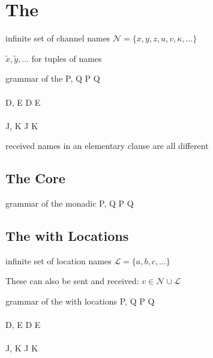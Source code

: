 \section{The \JoinCalc}

infinite set of channel names
$ \mathcal{N} = \{ x, y, z, u, v, \kappa, \ldots \} $

$ \tilde{x}, \tilde{y}, \ldots $ for tuples of names

\begin{JDef}{grammar of the \joincalc}
  P, Q
  \grmr {}
  \altn {}
  \altn P \jpar Q
  \altn \jnullproc
  \\ \\
  D, E
  \grmr {}
  \altn D \jcon E
  \altn \jnulldef
  \\ \\
  J, K
  \grmr {}
  \altn J \jpat K
\end{JDef}

received names in an elementary clause are all different


\subsection{The Core \JoinCalc}

\begin{JDef}{grammar of the monadic \joincalc}
  P, Q
  \grmr {}
  \altn P \jpar Q
  \altn {}
\end{JDef}


\subsection{The \JoinCalc with Locations}

infinite set of location names
$ \mathcal{L} = \{ a, b, c, \ldots \} $

These can also be sent and received:
$ v \in \mathcal{N} \cup \mathcal{L} $


\begin{JDef}{grammar of the \joincalc with locations}
  P, Q
  \grmr {}
  \altn {}
  \altn P \jpar Q
  \altn \jnullproc
  \altn {}
  \\ \\
  D, E
  \grmr {}
  \altn D \jcon E
  \altn \jnulldef
  \altn {}
  \\ \\
  J, K
  \grmr {}
  \altn J \jpat K
\end{JDef}

